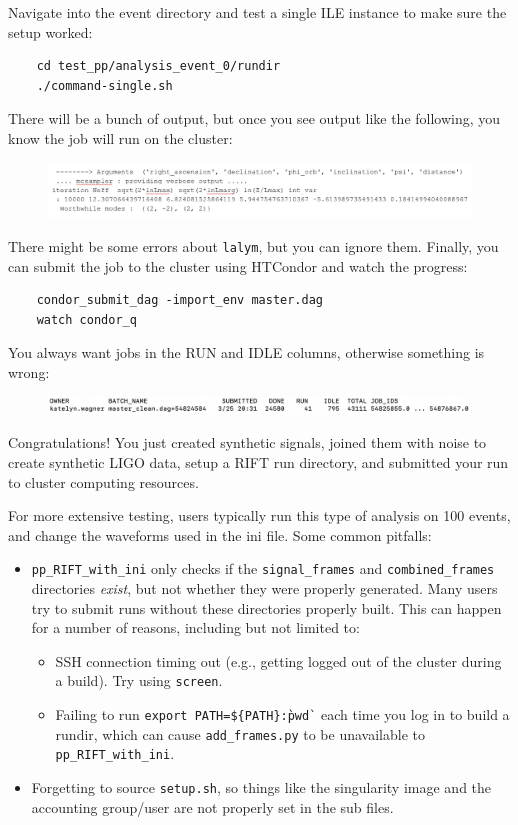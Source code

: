 \documentclass{article}
\begin{document}
Navigate into the event directory and test a single ILE instance to make sure the setup worked:
\begin{verbatim}
    cd test_pp/analysis_event_0/rundir
    ./command-single.sh
\end{verbatim}
\newpage
There will be a bunch of output, but once you see output like the following, you know the job will run on the cluster:
\begin{figure}[h!]
    \centering
    \includegraphics[width=0.9\linewidth]{output.png}
    \label{fig:output}
\end{figure}
There might be some errors about \texttt{lalym}, but you can ignore them.
Finally, you can submit the job to the cluster using HTCondor and watch the progress:
\begin{verbatim}
    condor_submit_dag -import_env master.dag
    watch condor_q
\end{verbatim}

You always want jobs in the RUN and IDLE columns, otherwise something is wrong:
\begin{figure}[h!]
    \centering
    \includegraphics[width=0.9\linewidth]{condor.png}
    \label{fig:condor}
\end{figure}
Congratulations! You just created synthetic signals, joined them with noise to create synthetic LIGO data, setup a RIFT run directory, and submitted your run to cluster computing resources.

For more extensive testing, users typically run this type of analysis on 100 events, and change the waveforms used in the ini file. Some common pitfalls:


\begin{itemize}
    \item \texttt{pp\_RIFT\_with\_ini} only checks if the \texttt{signal\_frames} and \texttt{combined\_frames} directories \textit{exist}, but not whether they were properly generated. Many users try to submit runs without these directories properly built. This can happen for a number of reasons, including but not limited to:
    \begin{itemize}
        \item SSH connection timing out (e.g., getting logged out of the cluster during a build). Try using \texttt{screen}.
        \item Failing to run \texttt{export PATH=\$\{PATH\}:\`pwd\`} each time you log in to build a rundir, which can cause \texttt{add\_frames.py} to be unavailable to \texttt{pp\_RIFT\_with\_ini}.
    \end{itemize}
    \item Forgetting to source \texttt{setup.sh}, so things like the singularity image and the accounting group/user are not properly set in the sub files.
\end{itemize}
\end{document}
